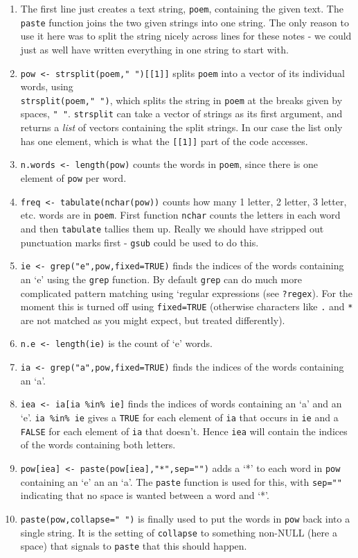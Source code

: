 \documentclass[10pt] {article}
\theoremstyle{definition}
\begin{document}
\begin{enumerate}
\item The first line just creates a text string, {\tt poem}, containing the given text. The {\tt paste} function joins the two given strings into one string. The only reason to use it here was to split the string nicely across lines for these notes - we could just as well have written everything in one string to start with.
\item \lstinline+pow <- strsplit(poem," ")[[1]]+ splits {\tt poem} into a vector of its individual words, using\\ \lstinline+strsplit(poem," ")+, which splits the string in {\tt poem} at the breaks given by spaces, \lstinline+" "+. {\tt strsplit} can take a vector of strings as its first argument, and returns a {\em list} of vectors containing the split strings. In our case the list only has one element, which is what the \lstinline+[[1]]+ part of the code accesses. 
\item \lstinline+n.words <- length(pow)+ counts the words in {\tt poem}, since there is one element of {\tt pow} per word.
\item \lstinline+freq <- tabulate(nchar(pow))+ counts how many 1 letter, 2 letter, 3 letter, etc. words are in {\tt poem}. First function {\tt nchar} counts the letters in each word and then {\tt tabulate} tallies them up. Really we should have stripped out punctuation marks first - {\tt gsub} could be used to do this.
\item \lstinline+ie <- grep("e",pow,fixed=TRUE)+ finds the indices of the words containing an `e' using the {\tt grep} function. By default {\tt grep} can do much more complicated pattern matching using `regular expressions (see {\tt ?regex}). For the moment this is turned off using \lstinline+fixed=TRUE+ (otherwise characters like \lstinline+.+ and \lstinline+*+ are not matched as you might expect, but treated differently).
\item \lstinline+n.e <- length(ie)+ is the count of `e' words.
\item \lstinline+ia <- grep("a",pow,fixed=TRUE)+ finds the indices of the words containing an `a'.
\item \lstinline+iea <- ia[ia %in% ie]+ finds the indices of words containing an `a' and an `e'. \lstinline+ia %in% ie+ gives a {\tt TRUE} for each element of {\tt ia} that occurs in {\tt ie} and a {\tt FALSE} for each element of {\tt ia} that doesn't. Hence {\tt iea} will contain the indices of the words containing both letters.
\item \lstinline+pow[iea] <- paste(pow[iea],"*",sep="")+ adds a `*' to each word in {\tt pow} containing an `e' an an `a'. The {\tt paste} function is used for this, with \lstinline+sep=""+ indicating that no space is wanted between a word and `*'.
\item \lstinline+paste(pow,collapse=" ")+ is finally used to put the words in {\tt pow} back into a single string. It is the setting of {\tt collapse} to something non-NULL (here a space) that signals to {\tt paste} that this should happen.
\end{enumerate}
\end{document}
